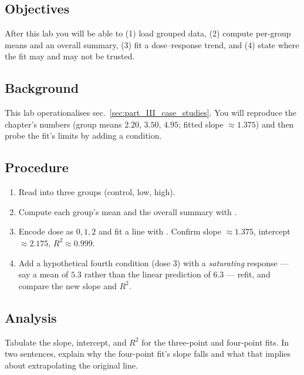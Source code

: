 \documentclass[
]{article}
\providecommand{\tightlist}{%
  \setlength{\itemsep}{0pt}\setlength{\parskip}{0pt}}
\theoremstyle{plain}
\theoremstyle{definition}
\begin{document}
\subsection{Objectives}\label{objectives-10}

After this lab you will be able to (1) load grouped data, (2) compute
per-group means and an overall summary, (3) fit a dose--response trend,
and (4) state where the fit may and may not be trusted.

\subsection{Background}\label{background-10}

This lab operationalises sec.~\ref{sec:part_III_case_studies}. You will
reproduce the chapter's numbers (group means \(2.20\), \(3.50\),
\(4.95\); fitted slope \(\approx
1.375\)) and then probe the fit's limits by adding a condition.

\subsection{Procedure}\label{procedure-10}

\begin{enumerate}
\def\labelenumi{\arabic{enumi}.}
\tightlist
\item
  Read  into three groups
  (control, low, high).
\item
  Compute each group's mean and the overall summary with
  .
\item
  Encode dose as \(0, 1, 2\) and fit a line with
  . Confirm slope \(\approx 1.375\),
  intercept \(\approx 2.175\), \(R^2 \approx 0.999\).
\item
  Add a hypothetical fourth condition (dose \(3\)) with a
  \emph{saturating} response --- say a mean of \(5.3\) rather than the
  linear prediction of \(6.3\) --- refit, and compare the new slope and
  \(R^2\).
\end{enumerate}

\subsection{Analysis}\label{analysis-10}

Tabulate the slope, intercept, and \(R^2\) for the three-point and
four-point fits. In two sentences, explain why the four-point fit's
slope falls and what that implies about extrapolating the original line.
\end{document}
